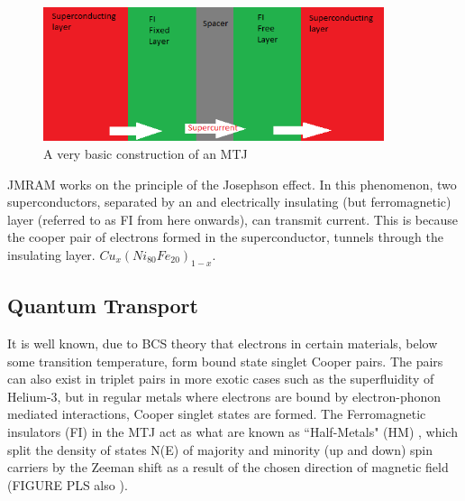 \documentclass[12pt]{article}
\begin{document}
\begin{figure}[htp]
    \centering
    \begin{measuredfigure}
    \includegraphics[width=10cm]{mtj}
    \caption{A very basic construction of an MTJ}
    \end{measuredfigure}
    \end{figure} 
    
JMRAM works on the principle of the Josephson effect. In this phenomenon, two superconductors, separated by an and electrically insulating (but ferromagnetic) layer (referred to as FI from here onwards), can transmit current. This is because the cooper pair of electrons formed in the superconductor, tunnels through the insulating layer. $Cu_x(Ni_80Fe_20)_{1-x}$. 



\subsection{Quantum Transport}

It is well known, due to BCS theory \cite{BCS} that electrons in certain materials, below some transition temperature, form bound state singlet Cooper pairs. The pairs can also exist in triplet pairs in more exotic cases such as the superfluidity of Helium-3, but in regular metals where electrons are bound by electron-phonon mediated interactions, Cooper singlet states are formed. The Ferromagnetic insulators (FI) in the MTJ act as what are known as ``Half-Metals" (HM) \cite{HM}, which split the density of states N(E) of majority and minority (up and down) spin carriers by the Zeeman shift as a result of the chosen direction of magnetic field (FIGURE PLS also \cite{HM}). 
\end{document}
